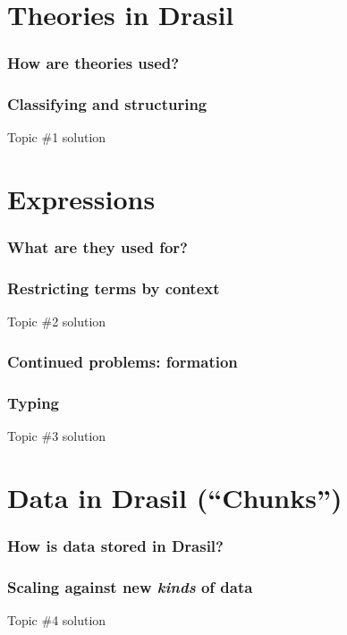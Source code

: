 \documentclass[xcolor={dvipsnames}]{beamer}
\begin{document}
\section{Theories in Drasil}

\begin{frame}
  \frametitle{How are theories used?}
\end{frame}

\begin{frame}
  \frametitle{Classifying and structuring}

  Topic \#1 solution
\end{frame}

\section{Expressions}

\begin{frame}
  \frametitle{What are they used for?}
\end{frame}

\begin{frame}
  \frametitle{Restricting terms by context}

  Topic \#2 solution
\end{frame}

\begin{frame}
  \frametitle{Continued problems: formation}
\end{frame}

\begin{frame}
  \frametitle{Typing}

  Topic \#3 solution
\end{frame}

\section{Data in Drasil (\textquotedblleft{}Chunks\textquotedblright{})}

\begin{frame}
  \frametitle{How is data stored in Drasil?}
\end{frame}

\begin{frame}
  \frametitle{Scaling against new \textit{kinds} of data}

  Topic \#4 solution
\end{frame}
\end{document}
